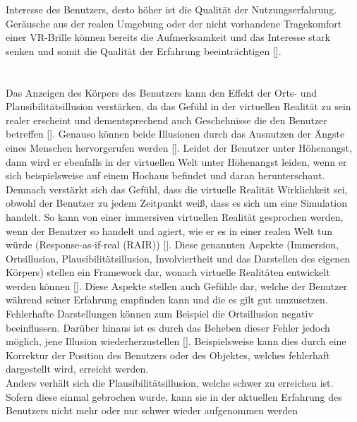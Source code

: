 \documentclass[a4paper,12pt,oneside]{article}
\begin{document}
        Interesse des Benutzers, desto höher ist die Qualität der Nutzungserfahrung.
        Geräusche aus der realen Umgebung oder der nicht vorhandene Tragekomfort einer 
        VR-Brille können bereits die Aufmerksamkeit und 
        das Interesse stark senken und somit die Qualität
        der Erfahrung beeinträchtigen [\cite[227]{Witmer1998}]. \\ \\ \\
        Das Anzeigen des Körpers des Benutzers
        kann den Effekt der Orts- und Plausibilitätsillusion verstärken, da das
        Gefühl in der virtuellen Realität zu sein realer erscheint und 
        dementsprechend auch Geschehnisse die den
        Benutzer betreffen [\cite{Slater2009}]. Genauso können beide Illusionen durch das
        Ausnutzen der Ängste eines Menschen hervorgerufen werden [\cite{Slater2009}].
        Leidet der Benutzer unter Höhenangst, dann wird er ebenfalls in der virtuellen
        Welt unter Höhenangst leiden, wenn er sich beispielsweise auf einem Hochaus 
        befindet und daran herunterschaut. 
        Demnach verstärkt sich das Gefühl, dass die virtuelle Realität Wirklichkeit sei,
        obwohl der Benutzer zu jedem Zeitpunkt weiß, dass es sich um eine Simulation handelt.
        So kann von einer immersiven
        virtuellen Realität gesprochen werden, wenn der Benutzer so handelt und agiert, wie er es
        in einer realen Welt tun würde (\glqq Response-as-if-real\grqq{} (RAIR)) 
        [\cite{Slater2009}]. Diese genannten Aspekte (Immersion, Ortsillusion, 
        Plausibilitätsillusion, Involviertheit und das Darstellen des eigenen Körpers) 
        stellen ein Framework dar, wonach virtuelle Realitäten entwickelt werden können 
        [\cite{Slater2009}]. Diese Aspekte stellen auch Gefühle dar, welche der Benutzer
        während seiner Erfahrung empfinden kann und die es gilt gut umzusetzen.
        Fehlerhafte Darstellungen können zum Beispiel die Ortsillusion negativ beeinflussen.
        Darüber hinaus ist es durch das Beheben dieser Fehler jedoch möglich, jene Illusion
        wiederherzustellen [\cite{Slater2009}]. Beispielsweise kann dies durch eine Korrektur
        der Position des Benutzers oder des Objektes, welches fehlerhaft dargestellt wird,
        erreicht werden. \\
        Anders verhält sich die Plausibilitätsillusion, welche schwer
        zu erreichen ist. Sofern diese einmal gebrochen wurde, kann sie in der aktuellen 
        Erfahrung des Benutzers nicht mehr oder nur schwer wieder aufgenommen werden 
\end{document}
